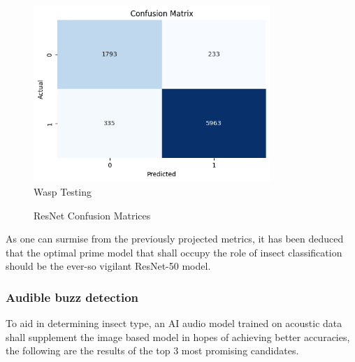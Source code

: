 \documentclass[12pt]{article}
\begin{document}
\begin{enumerate}
\begin{figure}[H]
\begin{minipage}{0.45\textwidth}
				\includegraphics[width=0.8\textwidth]{Images/Confusion/res wasps test.png} \\ \vspace{0.25 cm}
				Wasp Testing
			\end{minipage}
			\vspace{1 cm}
			\caption{ResNet Confusion Matrices}
		\end{figure}
	\end{enumerate}
	As one can surmise from the previously projected metrics, it has been deduced that the optimal prime model that shall occupy the role of insect classification should be the ever-so vigilant ResNet-50 model.
	\subsubsection{Audible buzz detection}
	To aid in determining insect type, an AI audio model trained on acoustic data shall supplement the image based model in hopes of achieving better accuracies, the following are the results of the top 3 most promising candidates.
	
\end{document}
